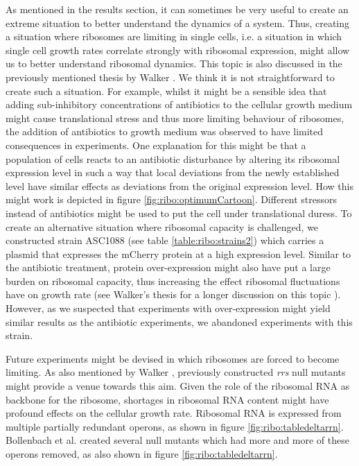 As mentioned in the results section, it can sometimes be very useful to create an extreme situation to better understand the dynamics of a system.
%
Thus, creating a situation where ribosomes are limiting in single cells, i.e. a situation in which single cell growth rates correlate strongly with ribosomal expression, might allow us to better understand ribosomal dynamics.
%
This topic is also discussed in the previously mentioned thesis by Walker \cite{Walker2016t}. 
%
We think it is not straightforward to create such a situation.
%
For example, whilst it might be a sensible idea that adding sub-inhibitory concentrations of antibiotics to the cellular growth medium might cause translational stress and 
thus more limiting behaviour of ribosomes,
the addition of antibiotics to growth medium was observed to have limited consequences in experiments.
%
One explanation for this 
might be that a population of cells reacts to an antibiotic disturbance by altering its ribosomal expression level 
in such a way that local deviations from the newly established level have similar effects as deviations from the original expression level.
How this might work is depicted in figure \ref{fig:ribo:optimumCartoon}.
%
Different stressors instead of antibiotics might be used to put the cell under translational duress.
%
To create an alternative situation where ribosomal capacity is challenged, 
we constructed strain ASC1088 (see table \ref{table:ribo:strains2}) which carries a plasmid that expresses the mCherry protein at a high expression level.
%
Similar to the antibiotic treatment, protein over-expression might also have put a large burden on ribosomal capacity, thus increasing the effect ribosomal fluctuations have on growth rate (see Walker's thesis for a longer discussion on this topic \cite{Walker2016t}).
%
However, 
as we suspected that experiments with over-expression might yield similar results as the antibiotic experiments, 
we abandoned experiments with this strain.

Future experiments might be devised in which ribosomes are forced to become limiting.
%
As also mentioned by Walker \cite{Walker2016t}, previously constructed \textit{rrs} null mutants \cite{Condon1993, Condon1995, Quan2015, Bollenbach2009} might provide a venue towards this aim.
%
Given the role of the ribosomal RNA as backbone for the ribosome, shortages in ribosomal RNA content might have profound effects on the cellular growth rate.
%
Ribosomal RNA is expressed from multiple partially redundant operons, as shown in figure \ref{fig:ribo:tabledeltarrn}. 
%
Bollenbach et al. \cite{Bollenbach2009} created several null mutants which had more and more of these operons removed, as also shown in figure \ref{fig:ribo:tabledeltarrn}. 
%

